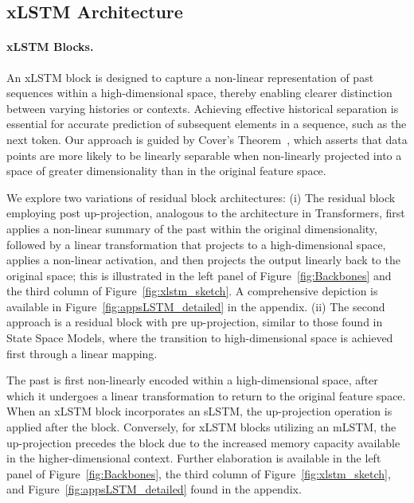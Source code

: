 \subsection{xLSTM Architecture}
\label{sec:xLSTMarch}

\paragraph{xLSTM Blocks.}
\label{sec:xLSTMblock}
An xLSTM block is designed to capture a non-linear representation of past sequences within a high-dimensional space, thereby enabling clearer distinction between varying histories or contexts. Achieving effective historical separation is essential for accurate prediction of subsequent elements in a sequence, such as the next token. Our approach is guided by Cover’s Theorem~\citep{Cover:65}, which asserts that data points are more likely to be linearly separable when non-linearly projected into a space of greater dimensionality than in the original feature space. 

We explore two variations of residual block architectures: (i) The residual block employing post up-projection, analogous to the architecture in Transformers, first applies a non-linear summary of the past within the original dimensionality, followed by a linear transformation that projects to a high-dimensional space, applies a non-linear activation, and then projects the output linearly back to the original space; this is illustrated in the left panel of Figure~\ref{fig:Backbones} and the third column of Figure~\ref{fig:xlstm_sketch}. A comprehensive depiction is available in Figure~\ref{fig:appsLSTM_detailed} in the appendix. (ii) The second approach is a residual block with pre up-projection, similar to those found in State Space Models, where the transition to high-dimensional space is achieved first through a linear mapping.

The past is first non-linearly encoded within a high-dimensional space, after which it undergoes a linear transformation to return to the original feature space. When an xLSTM block incorporates an sLSTM, the up-projection operation is applied after the block. Conversely, for xLSTM blocks utilizing an mLSTM, the up-projection precedes the block due to the increased memory capacity available in the higher-dimensional context. Further elaboration is available in the left panel of Figure~\ref{fig:Backbones}, the third column of Figure~\ref{fig:xlstm_sketch}, and Figure~\ref{fig:appsLSTM_detailed} found in the appendix.

